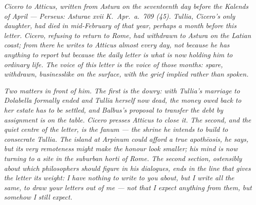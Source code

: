 
\textit{Cicero to Atticus, written from Astura on the seventeenth
day before the Kalends of April --- Perseus: \textit{Asturae
xvii K.~Apr.~a.~709 (45)}. Tullia, Cicero's only daughter, had died
in mid-February of that year, perhaps a month before this letter.
Cicero, refusing to return to Rome, had withdrawn to Astura on the
Latian coast; from there he writes to Atticus almost every day,
not because he has anything to report but because the daily letter
is what is now holding him to ordinary life. The voice of this
letter is the voice of those months: spare, withdrawn, businesslike
on the surface, with the grief implied rather than spoken.}

\textit{Two matters in front of him. The first is the dowry: with
Tullia's marriage to Dolabella formally ended and Tullia herself
now dead, the money owed back to her estate has to be settled, and
Balbus's proposal to transfer the debt by assignment is on the
table. Cicero presses Atticus to close it. The second, and the
quiet centre of the letter, is the \textit{fanum} --- the shrine
he intends to build to consecrate Tullia. The island at Arpinum
could afford a true \textit{apoth\=eosis}, he says, but its very
remoteness might make the honour look smaller; his mind is now
turning to a site in the suburban \textit{horti} of Rome. The
second section, ostensibly about which philosophers should figure
in his dialogues, ends in the line that gives the letter its
weight: I have nothing to write to you about, but I write all the
same, to draw your letters out of me --- not that I expect anything
from them, but somehow I still expect.}
